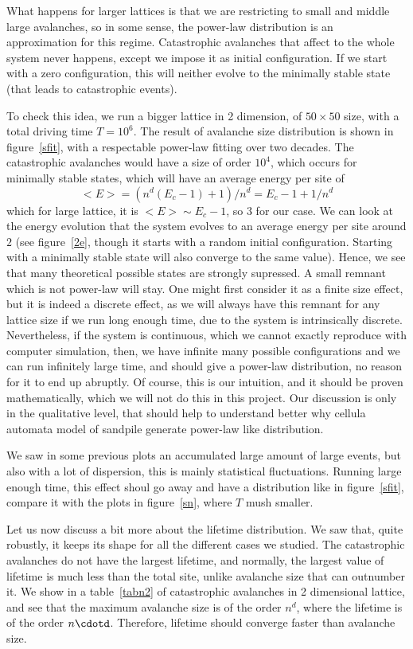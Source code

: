 What happens for larger lattices is that we are restricting to small and middle large avalanches, so in some sense,
the power-law distribution is an approximation for this regime. 
Catastrophic avalanches that affect to the whole system never happens, except we impose it as initial configuration.
If we start with a zero configuration, this will neither evolve to the minimally stable state (that leads to catastrophic events). 

To check this idea, we run a bigger lattice in 2 dimension, of $50\times 50$ size, with a total driving time $T=10^6$. 
The result of avalanche size distribution is shown in figure~\ref{sfit}, with a respectable power-law fitting over two decades.
The catastrophic avalanches would have a size of order  $10^4$, which occurs for minimally stable states, which will have an average energy per site of
\[
<E>=(n^d(E_c-1)+1)/n^d=E_c-1+1/n^d
\]
which for large lattice, it is $<E>\sim E_c-1$, so $3$ for our case. We can look at the energy evolution that the system evolves to an
average energy per site around $2$ (see figure~\ref{2e}, though it starts with a random initial configuration. 
Starting with a minimally stable state will also converge to the same value).
Hence, we see that many theoretical possible states are strongly supressed. 
A small remnant which is not power-law will stay. One might first consider it as a finite size effect, 
but it is indeed a discrete effect, as we will always have this remnant for any lattice size if we run long enough time, 
due to the system is intrinsically discrete.
Nevertheless, if the system is continuous, which we cannot exactly reproduce with computer simulation, 
then, we have infinite many possible configurations and we can run infinitely large time, 
and should give a power-law distribution, no reason for it to end up abruptly.
Of course, this is our intuition, and it should be proven mathematically, which we will not do this in this project.
Our discussion is only in the qualitative level, that should help to understand better why cellula automata model of sandpile 
generate power-law like distribution.

We saw in some previous plots an accumulated large amount of large events, but also with a lot of dispersion, 
this is mainly statistical fluctuations. 
Running large enough time, this effect shoul go away and have a distribution like in figure~\ref{sfit}, compare it with the plots in figure~\ref{sn}, where $T$ mush smaller.

Let us now discuss a bit more about the lifetime distribution.  We saw that, quite robustly, it keeps its shape for all the different cases we studied.
The catastrophic avalanches do not have the largest lifetime, and normally, the largest value of lifetime is much less than the total site, unlike avalanche size that can outnumber it.
We show in a table~\ref{tabn2} of catastrophic avalanches in 2 dimensional lattice, and see that the maximum avalanche size is of the order $n^d$, where the lifetime is of the order $n\cdotd$.
Therefore, lifetime should converge faster than avalanche size.

